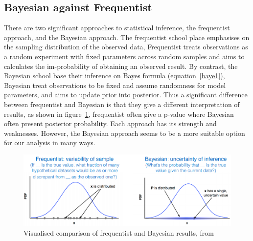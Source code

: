 \subsection{Bayesian against Frequentist}

There are two significant approaches to statistical inference, the frequentist approach, and the Bayesian approach. The frequentist school place emphasises on the sampling distribution of the observed data, Frequentist treats observations as a random experiment with fixed parameters across random samples and aims to calculates the im-probability of obtaining an observed result. By contrast, the Bayesian school base their inference on Bayes formula (equation~\ref{baye1}), Bayesian treat observations to be fixed and assume randomness for model parameters, and aims to update prior into posterior. Thus a significant difference between frequentist and Bayesian is that they give a different interpretation of results, as shown in figure~\ref{fig:freqbaye}, frequentist often give a p-value where Bayesian often present posterior probability. Each approach has its strength and weaknesses. However, the Bayesian approach seems to be a more suitable option for our analysis in many ways.

\begin{figure}[!h]
	\centering
	\includegraphics[width=0.7\linewidth]{Figures/freqbaye}
	\caption{Visualised comparison of frequentist and Bayesian results, from \citet{Wolfgang2016} }
	\label{fig:freqbaye}
\end{figure}

